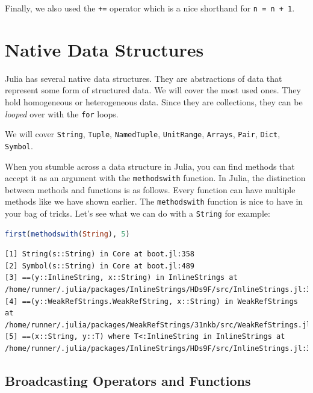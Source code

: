 \documentclass[
  notoc %
]{tufte-book}
\newcommand{\passthrough}[1]{#1}
\begin{document}
Finally, we also used the \passthrough{\lstinline!+=!} operator which is
a nice shorthand for \passthrough{\lstinline!n = n + 1!}.

\hypertarget{sec:data_structures}{%
\section{Native Data Structures}\label{sec:data_structures}}

Julia has several native data structures. They are abstractions of data
that represent some form of structured data. We will cover the most used
ones. They hold homogeneous or heterogeneous data. Since they are
collections, they can be \emph{looped} over with the
\passthrough{\lstinline!for!} loops.

We will cover \passthrough{\lstinline!String!},
\passthrough{\lstinline!Tuple!}, \passthrough{\lstinline!NamedTuple!},
\passthrough{\lstinline!UnitRange!}, \passthrough{\lstinline!Arrays!},
\passthrough{\lstinline!Pair!}, \passthrough{\lstinline!Dict!},
\passthrough{\lstinline!Symbol!}.

When you stumble across a data structure in Julia, you can find methods
that accept it as an argument with the
\passthrough{\lstinline!methodswith!} function. In Julia, the
distinction between methods and functions is as follows. Every function
can have multiple methods like we have shown earlier. The
\passthrough{\lstinline!methodswith!} function is nice to have in your
bag of tricks. Let's see what we can do with a
\passthrough{\lstinline!String!} for example:

\begin{lstlisting}[language=Julia]
first(methodswith(String), 5)
\end{lstlisting}

\begin{lstlisting}[language=Output]
[1] String(s::String) in Core at boot.jl:358
[2] Symbol(s::String) in Core at boot.jl:489
[3] ==(y::InlineString, x::String) in InlineStrings at /home/runner/.julia/packages/InlineStrings/HDs9F/src/InlineStrings.jl:341
[4] ==(y::WeakRefStrings.WeakRefString, x::String) in WeakRefStrings at /home/runner/.julia/packages/WeakRefStrings/31nkb/src/WeakRefStrings.jl:51
[5] ==(x::String, y::T) where T<:InlineString in InlineStrings at /home/runner/.julia/packages/InlineStrings/HDs9F/src/InlineStrings.jl:335
\end{lstlisting}

\hypertarget{sec:broadcasting}{%
\subsection{Broadcasting Operators and
Functions}\label{sec:broadcasting}}
\end{document}
